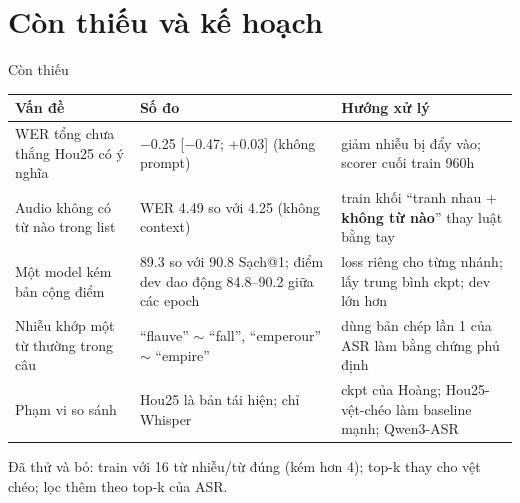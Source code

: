 \documentclass[aspectratio=169,xcolor=table]{beamer}
\begin{document}
\section{Còn thiếu và kế hoạch}
\begin{frame}{Còn thiếu}
\renewcommand{\arraystretch}{1.25}\footnotesize
\begin{tabular}{L{4.4cm}L{5.0cm}L{4.4cm}}
\toprule
Vấn đề & Số đo & Hướng xử lý \\
\midrule
WER tổng chưa thắng Hou25 có ý nghĩa & $-$0.25 [$-$0.47; +0.03] (không prompt) & giảm nhiễu bị đẩy vào; scorer cuối train 960h \\
Audio không có từ nào trong list & WER 4.49 so với 4.25 (không context) & train khối ``tranh nhau + \textbf{không từ nào}'' thay luật bằng tay \\
Một model kém bản cộng điểm & 89.3 so với 90.8 Sạch@1; điểm dev dao động 84.8--90.2 giữa các epoch & loss riêng cho từng nhánh; lấy trung bình ckpt; dev lớn hơn \\
Nhiễu khớp một từ thường trong câu & ``flauve'' $\sim$ ``fall'', ``emperour'' $\sim$ ``empire'' & dùng bản chép lần 1 của ASR làm bằng chứng phủ định \\
Phạm vi so sánh & Hou25 là bản tái hiện; chỉ Whisper & ckpt của Hoàng; Hou25-vệt-chéo làm baseline mạnh; Qwen3-ASR \\
\bottomrule
\end{tabular}
\vspace{0.2cm}

{\footnotesize Đã thử và bỏ: train với 16 từ nhiễu/từ đúng (kém hơn 4); top-k thay cho vệt chéo; lọc thêm theo top-k của ASR.}
\end{frame}
\end{document}
